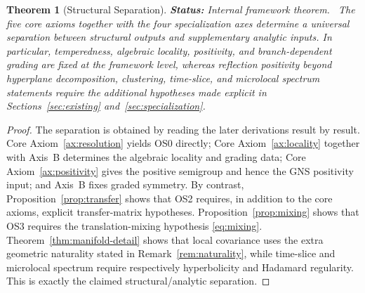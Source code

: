 \documentclass[12pt,a4paper]{article}
\theoremstyle{plain}
\newtheorem{theorem}{Theorem}[section]
\theoremstyle{definition}
\theoremstyle{remark}
\newcommand{\status}[1]{\textnormal{\textbf{Status:} #1.}\ }
\begin{document}
\begin{theorem}[Structural Separation]\label{thm:separation}
  \status{Internal framework theorem}
  The five core axioms together with the four specialization axes
  determine a universal separation between structural outputs and
  supplementary analytic inputs. In particular, temperedness,
  algebraic locality, positivity, and branch-dependent grading are
  fixed at the framework level, whereas reflection positivity beyond
  hyperplane decomposition, clustering, time-slice, and microlocal
  spectrum statements require the additional hypotheses made explicit
  in Sections~\ref{sec:existing} and~\ref{sec:specialization}.
\end{theorem}
\begin{proof}
  The separation is obtained by reading the later derivations result by
  result. Core Axiom~\ref{ax:resolution} yields OS0 directly; Core
  Axiom~\ref{ax:locality} together with Axis~B determines the algebraic
  locality and grading data; Core Axiom~\ref{ax:positivity} gives the
  positive semigroup and hence the GNS positivity input; and Axis~B
  fixes graded symmetry. By contrast, Proposition~\ref{prop:transfer}
  shows that OS2 requires, in addition to the core axioms, explicit
  transfer-matrix hypotheses. Proposition~\ref{prop:mixing} shows that
  OS3 requires the translation-mixing hypothesis \eqref{eq:mixing}.
  Theorem~\ref{thm:manifold-detail} shows that local covariance uses
  the extra geometric naturality stated in
  Remark~\ref{rem:naturality}, while time-slice and microlocal
  spectrum require respectively hyperbolicity and Hadamard
  regularity. This is exactly the claimed structural/analytic
  separation.
\end{proof}
\end{document}
